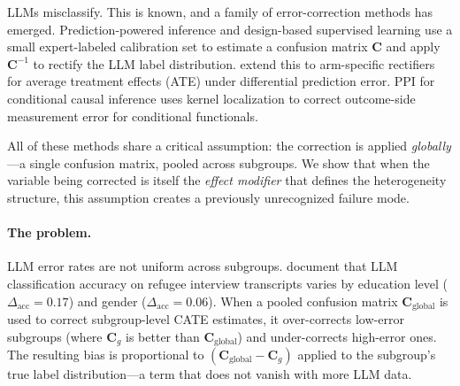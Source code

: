 \documentclass[11pt,a4paper]{article}
\begin{document}
LLMs misclassify. This is known, and a family of error-correction methods has emerged.
Prediction-powered inference \citep[PPI;][]{angelopoulos2023ppi} and design-based supervised learning \citep[DSL;][]{egami2024dsl} use a small expert-labeled calibration set to estimate a confusion matrix $\mathbf{C}$ and apply $\mathbf{C}^{-1}$ to rectify the LLM label distribution.
\citet{mozer2026arm} extend this to arm-specific rectifiers for average treatment effects (ATE) under differential prediction error.
PPI for conditional causal inference \citep[PPCI;][]{sui2026ppci} uses kernel localization to correct outcome-side measurement error for conditional functionals.

All of these methods share a critical assumption: the correction is applied \emph{globally}---a single confusion matrix, pooled across subgroups.
We show that when the variable being corrected is itself the \emph{effect modifier} that defines the heterogeneity structure, this assumption creates a previously unrecognized failure mode.

\paragraph{The problem.}
LLM error rates are not uniform across subgroups.
\citet{ashwin2025llm} document that LLM classification accuracy on refugee interview transcripts varies by education level ($\Delta_{\text{acc}} = 0.17$) and gender ($\Delta_{\text{acc}} = 0.06$).
When a pooled confusion matrix $\mathbf{C}_{\text{global}}$ is used to correct subgroup-level CATE estimates, it over-corrects low-error subgroups (where $\mathbf{C}_g$ is better than $\mathbf{C}_{\text{global}}$) and under-corrects high-error ones.
The resulting bias is proportional to $(\mathbf{C}_{\text{global}} - \mathbf{C}_g)$ applied to the subgroup's true label distribution---a term that does not vanish with more LLM data.
\end{document}
